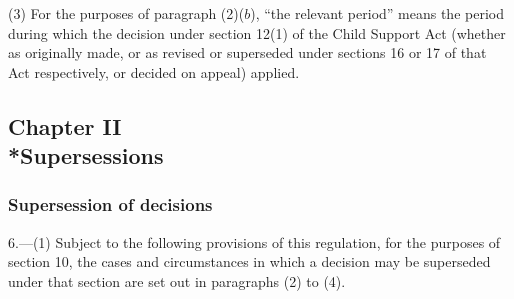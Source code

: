 \documentclass[12pt,a4paper]{article}
\begin{document}
{%
(3) For the purposes of paragraph (2)($b$), “the relevant period” means the period during which the decision under section 12(1) of the Child Support Act (whether as originally made, or as revised or superseded under sections 16 or 17 of that Act respectively, or decided on appeal) applied.

}

\subsection[Chapter II --- Supersessions]{Chapter II\\*Supersessions}

\subsubsection[6. Supersession of decisions]{Supersession of decisions}

\renewcommand\parthead{--- Part II Chapter II}

6.—(1) Subject to the following provisions of this regulation, for the purposes of section 10, the cases and circumstances in which a decision may be superseded under that section are set out in paragraphs (2) to (4).
\end{document}
